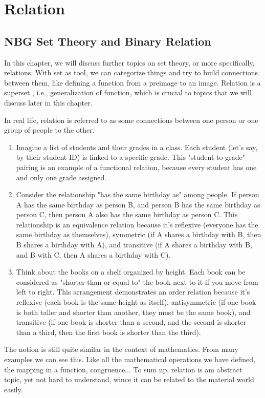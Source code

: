 \chapterspaceabove{4.75cm} 
\chapterspacebelow{7.25cm} 
\chapter{Relation}
\tikzinitRelation
\section{NBG Set Theory and Binary Relation}
In this chapter, we will discuss further topics on set theory, or more specifically, 
relations. With set as tool, we can categorize things and try to build connections 
between them, like defining a function from a preimage to an image. Relation is a superset
, i.e., generalization of function, which is crucial to topics that we will discuss
later in this chapter.

In real life, relation is referred to as some connections between one person or 
one group of people to the other. 
\begin{enumerate}
    \item Imagine a list of students and their grades in a class. Each student 
    (let's say, by their student ID) is linked to a specific grade. 
    This "student-to-grade" pairing is an example of a functional relation, 
    because every student has one and only one grade assigned.
    \item Consider the relationship "has the same birthday as" among people. If person A has the same birthday as person B, and person B has the same birthday as person C, then person A also has the same birthday as person C. This relationship is an equivalence relation because it's reflexive (everyone has the same birthday as themselves), symmetric (if A shares a birthday with B, then B shares a birthday with A), and transitive (if A shares a birthday with B, and B with C, then A shares a birthday with C).
    \item Think about the books on a shelf organized by height. Each book can be considered as "shorter than or equal to" the book next to it if you move from left to right. This arrangement demonstrates an order relation because it's reflexive (each book is the same height as itself), antisymmetric (if one book is both taller and shorter than another, they must be the same book), and transitive (if one book is shorter than a second, and the second is shorter than a third, then the first book is shorter than the third).
\end{enumerate} 
The notion is still quite similar in the context of
mathematics. From many examples we can see this. Like all the mathematical operations
we have defined, the mapping in a function, congruence...
To sum up, relation is am abstract topic, yet not hard to understand, wince it can be
related to the material world easily. 
